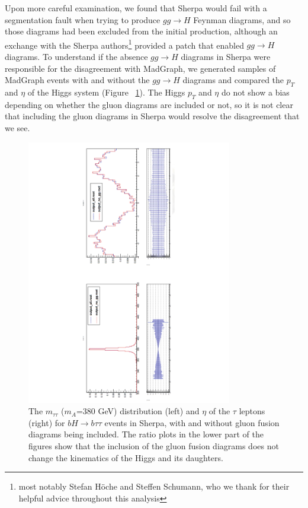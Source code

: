 Upon more careful examination, we found that Sherpa would fail with a segmentation fault
when trying to produce 
$gg\rightarrow H$ Feynman diagrams, and so those diagrams had been excluded from
the initial production, although
an exchange with the Sherpa authors\footnote{most notably Stefan H\"{o}che and Steffen 
Schumann, who we thank for their helpful advice throughout this analysis} provided 
a patch that enabled $gg\rightarrow H$ diagrams.  To understand
if the absence $gg\rightarrow H$ diagrams in Sherpa were responsible for the disagreement
with MadGraph, we generated samples of MadGraph events with and without the $gg\rightarrow H$
diagrams and compared the $p_T$ and $\eta$ of the Higgs system (Figure ~\ref{fig:ggH}).
The Higgs $p_T$ and $\eta$ do not show a bias depending on whether the gluon diagrams
are included or not, so it is not clear that including the gluon diagrams in Sherpa would
resolve the disagreement that we see. 

\begin{figure}
  \center
  \includegraphics[width=0.8\textwidth, angle=270]{MonteCarlo/figures/ggH.pdf}
  \caption{The $m_{\tau\tau}$ ($m_A$=380 GeV) distribution (left) and $\eta$ of the $\tau$ leptons (right)
  for $bH\rightarrow b\tau\tau$ events in Sherpa,
  with and without gluon fusion diagrams being included.  The ratio plots in the lower part of the
  figures show that the inclusion of the gluon fusion diagrams does not change the kinematics of the
  Higgs and its daughters. 
  \label{fig:ggH}}
\end{figure}

